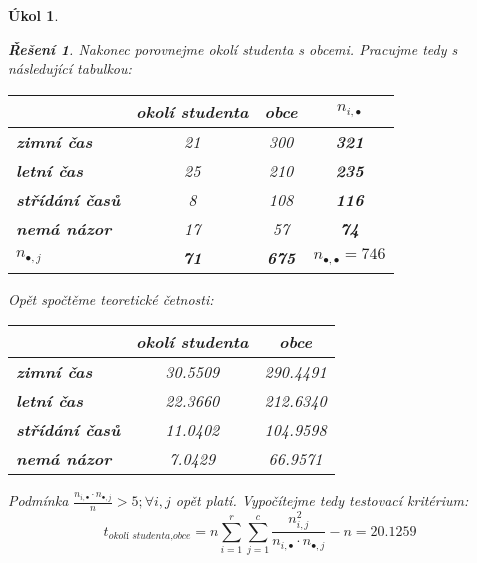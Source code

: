 \documentclass[11pt, a4paper]{article}
\theoremstyle{result}
\newtheorem*{result}{Řešení}
\newtheorem{task}{Úkol}
\begin{document}
\begin{task}
\begin{enumerate}[a)]
\begin{result}
            Nakonec porovnejme \textit{okolí studenta} s \textit{obcemi}. Pracujme tedy s následující tabulkou:

            \begin{center}
                \begin{tabular}{ |l|c|c|c| }
                    \hline
                    & \textbf{okolí studenta} & \textbf{obce} & \boldmath$n_{i, \bullet}$ \\
                    \hline
                    \textbf{zimní čas} & 21 & 300 & \textbf{321} \\
                    \hline
                    \textbf{letní čas} & 25 & 210 & \textbf{235} \\
                    \hline
                    \textbf{střídání časů} & 8 & 108 & \textbf{116} \\
                    \hline
                    \textbf{nemá názor} & 17 & 57 & \textbf{74} \\
                    \hline
                    \boldmath$n_{\bullet, j}$ & \textbf{71} & \textbf{675} & \boldmath$n_{\bullet, \bullet} = 746$ \\
                    \hline
                \end{tabular}
            \end{center}

            Opět spočtěme teoretické četnosti:

            \begin{center}
                \begin{tabular}{ |l|c|c| }
                    \hline
                    & \textbf{okolí studenta} & \textbf{obce} \\
                    \hline
                    \textbf{zimní čas} & 30.5509 & 290.4491 \\
                    \hline
                    \textbf{letní čas} & 22.3660 & 212.6340 \\
                    \hline
                    \textbf{střídání časů} & 11.0402 & 104.9598 \\
                    \hline
                    \textbf{nemá názor} & 7.0429 & 66.9571 \\
                    \hline
                \end{tabular}
            \end{center}

            Podmínka $\frac{n_{i, \bullet} \cdot n_{\bullet, j}}{n} > 5; \forall i,j$ opět platí. Vypočítejme tedy testovací kritérium:
            $$t_{\textit{okolí studenta}, \textit{obce}} = n \sum_{i=1}^{r} \sum_{j=1}^{c} \frac{n_{i, j}^2}{n_{i, \bullet} \cdot n_{\bullet, j}} - n = 20.1259$$


\end{result}
\end{enumerate}
\end{task}
\end{document}
